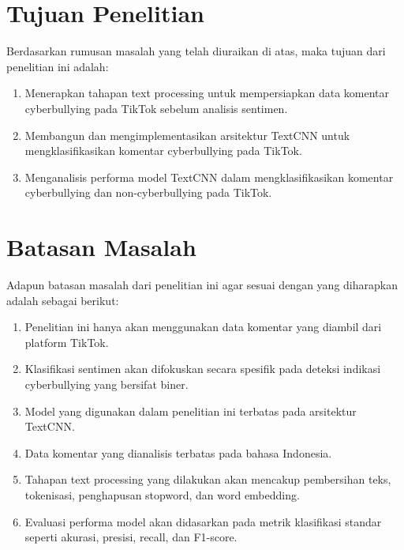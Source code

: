 \section{Tujuan Penelitian} \label{I.Tujuan}
Berdasarkan rumusan masalah yang telah diuraikan di atas, maka tujuan dari penelitian ini adalah: \par

\begin{enumerate}[noitemsep]
    \item Menerapkan tahapan text processing untuk mempersiapkan data komentar cyberbullying pada TikTok sebelum analisis sentimen.
    \item Membangun dan mengimplementasikan arsitektur TextCNN untuk mengklasifikasikan komentar cyberbullying pada TikTok.
    \item Menganalisis performa model TextCNN dalam mengklasifikasikan komentar cyberbullying dan non-cyberbullying pada TikTok.
\end{enumerate}


\section{Batasan Masalah} \label{I.Batasan}
Adapun batasan masalah dari penelitian ini agar sesuai dengan yang diharapkan adalah sebagai berikut: \par

\begin{enumerate}[noitemsep]
    \item Penelitian ini hanya akan menggunakan data komentar yang diambil dari platform TikTok.
    \item Klasifikasi sentimen akan difokuskan secara spesifik pada deteksi indikasi cyberbullying yang bersifat biner.
    \item Model yang digunakan dalam penelitian ini terbatas pada arsitektur TextCNN.
    \item Data komentar yang dianalisis terbatas pada bahasa Indonesia.
    \item Tahapan text processing yang dilakukan akan mencakup pembersihan teks, tokenisasi, penghapusan stopword, dan word embedding.
    \item Evaluasi performa model akan didasarkan pada metrik klasifikasi standar seperti akurasi, presisi, recall, dan F1-score.
\end{enumerate}

